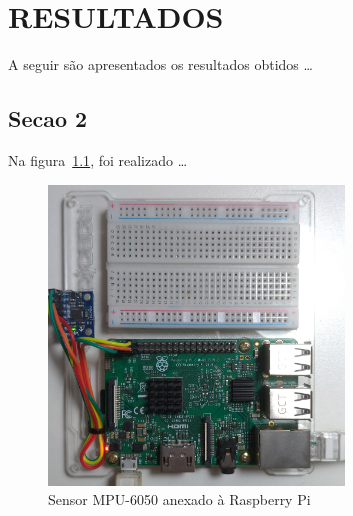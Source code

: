 \chapter{RESULTADOS}\label{chap:resuldatos}

A seguir são apresentados os resultados obtidos \ldots


\section{Secao 2}\label{sec:Secao_2}

Na figura~\ref{fig:mpu6050-proto-top}, foi realizado \ldots

\begin{figure}[H]
    \centering
    \caption{Sensor MPU-6050 anexado à Raspberry Pi}\label{fig:mpu6050-proto-top}
    \includegraphics[width=0.7\textwidth]{figuras/mpu6050-proto-top.jpg}
\end{figure}
